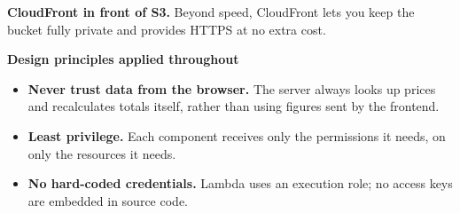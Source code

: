 \textbf{CloudFront in front of S3.} Beyond speed, CloudFront lets you
keep the bucket fully private and provides HTTPS at no extra cost.

\vspace{0.5em}\noindent\textbf{Design principles applied
throughout}\par

\begin{itemize}
\tightlist
\item
  \textbf{Never trust data from the browser.} The server always looks up
  prices and recalculates totals itself, rather than using figures sent
  by the frontend.
\item
  \textbf{Least privilege.} Each component receives only the permissions
  it needs, on only the resources it needs.
\item
  \textbf{No hard-coded credentials.} Lambda uses an execution role; no
  access keys are embedded in source code.
\end{itemize}
